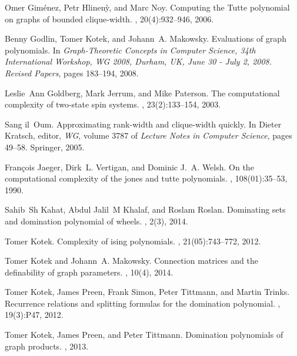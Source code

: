 \documentclass{llncs}
\begin{document}
\begin{thebibliography}{10}
Omer Gim{\'e}nez, Petr Hlinen{\`y}, and Marc Noy.
\newblock Computing the {T}utte polynomial on graphs of bounded clique-width.
, 20(4):932--946, 2006.

Benny Godlin, Tomer Kotek, and Johann~A. Makowsky.
\newblock Evaluations of graph polynomials.
\newblock In {\em Graph-Theoretic Concepts in Computer Science, 34th
  International Workshop, {WG} 2008, Durham, UK, June 30 - July 2, 2008.
  Revised Papers}, pages 183--194, 2008.

Leslie~Ann Goldberg, Mark Jerrum, and Mike Paterson.
\newblock The computational complexity of two-state spin systems.
, 23(2):133--154, 2003.

Sang il~Oum.
\newblock Approximating rank-width and clique-width quickly.
\newblock In Dieter Kratsch, editor, {\em WG}, volume 3787 of {\em Lecture
  Notes in Computer Science}, pages 49--58. Springer, 2005.

Fran{\c{c}}ois Jaeger, Dirk~L. Vertigan, and Dominic J.~A. Welsh.
\newblock On the computational complexity of the jones and tutte polynomials.
, 108(01):35--53, 1990.

Sahib~Sh Kahat, Abdul Jalil~M Khalaf, and Roslam Roslan.
\newblock Dominating sets and domination polynomial of wheels.
, 2(3), 2014.

Tomer Kotek.
\newblock Complexity of ising polynomials.
, 21(05):743--772,
  2012.

Tomer Kotek and Johann~A. Makowsky.
\newblock Connection matrices and the definability of graph parameters.
, 10(4), 2014.

Tomer Kotek, James Preen, Frank Simon, Peter Tittmann, and Martin Trinks.
\newblock Recurrence relations and splitting formulas for the domination
  polynomial.
, 19(3):P47, 2012.

Tomer Kotek, James Preen, and Peter Tittmann.
\newblock Domination polynomials of graph products.
, 2013.


\end{thebibliography}
\end{document}

